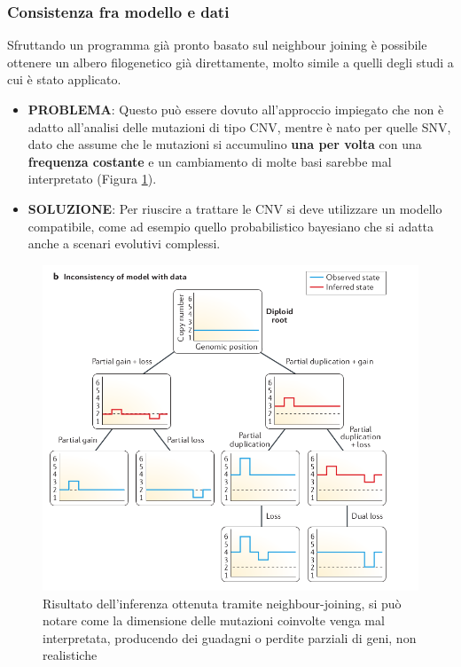 \documentclass[a4paper]{article}
\begin{document}
	\subsubsection{Consistenza fra modello e dati}
	
	Sfruttando un programma già pronto basato sul neighbour joining è possibile ottenere un albero
	filogenetico già direttamente, molto simile a quelli degli studi a cui è stato applicato.

	\begin{itemize}
	\item \textbf{PROBLEMA}: Questo può essere dovuto all'approccio impiegato che non è adatto all'analisi delle
	mutazioni di tipo CNV, mentre è nato per quelle SNV, dato che assume che le mutazioni si accumulino \textbf{una
	per volta} con una \textbf{frequenza costante} e un cambiamento di molte basi sarebbe mal interpretato (Figura \ref{fig:EsModello}).
	\item \textbf{SOLUZIONE}: Per riuscire a trattare le CNV si deve utilizzare un modello compatibile, come ad esempio
	quello probabilistico bayesiano che si adatta anche a scenari evolutivi complessi.
	\end{itemize}

	\begin{figure}[H]
	  \centering
	  \includegraphics[scale=0.3, keepaspectratio]{EsModello.png}%
	  \captionsetup{justification=centering,margin=0.5cm}
	  \caption{Risultato dell'inferenza ottenuta tramite neighbour-joining, si può notare come la 
	dimensione delle mutazioni coinvolte venga mal interpretata, producendo dei guadagni o perdite parziali di geni, non 
	realistiche} \label{fig:EsModello}
	\end{figure}
\end{document}
